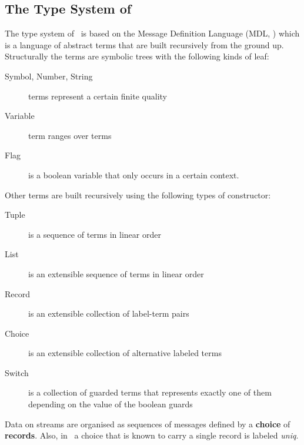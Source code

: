     \subsection*{The Type System of \ak\ }
The type system of \ak\ is based on the Message Definition Language (MDL, \cite{astrakahn}) which is a language of abstract terms that are built recursively from the ground up. Structurally the terms are symbolic trees with the following kinds of leaf:
\begin{description}
\item[Symbol, Number, String] terms represent a certain finite quality
\item[Variable] term ranges over terms
\item[Flag] is a boolean variable that only occurs in a certain context.
\end{description}
Other terms are built recursively using the following types of constructor:
\begin{description}
\item[Tuple] is a sequence of terms in linear order
\item[List] is an extensible sequence of terms in linear order
\item[Record] is an extensible collection of label-term pairs
\item[Choice] is an extensible collection of alternative labeled terms
\item[Switch] is a collection of guarded terms that represents exactly one of them depending on the value of the boolean guards
\end{description}

Data on streams are organised as sequences of messages defined by a \textbf{choice} of \textbf{records}. Also, in \ak\ a choice that is known to carry a single record is labeled \emph{uniq}.

